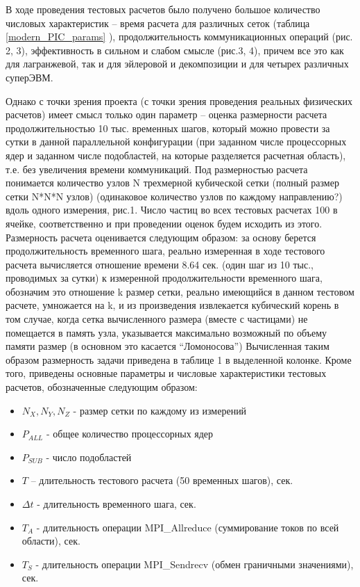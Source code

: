 В ходе проведения тестовых расчетов было получено большое количество числовых характеристик – время расчета для различных сеток (таблица \ref{modern_PIC_params} ), продолжительность коммуникационных операций (рис. 2, 3), эффективность в сильном и слабом смысле (рис.3, 4), причем все это как для лагранжевой, так и для эйлеровой и декомпозиции и для четырех различных суперЭВМ. 






Однако с точки зрения проекта (с точки зрения проведения реальных физических расчетов) имеет смысл только один параметр – оценка размерности расчета продолжительностью 10 тыс. временных шагов,  который можно провести за сутки в данной параллельной конфигурации (при заданном числе процессорных ядер и заданном числе подобластей, на которые разделяется расчетная область), т.е. без увеличения времени коммуникаций. Под размерностью расчета понимается количество узлов N трехмерной кубической сетки (полный размер сетки N*N*N узлов) (одинаковое количество узлов по каждому направлению?) вдоль одного измерения, рис.1. Число частиц во всех тестовых расчетах 100 в ячейке, соответственно и при проведении оценок будем исходить из этого. Размерность расчета оценивается следующим образом:
за основу берется продолжительность временного шага, реально измеренная в ходе тестового расчета
вычисляется отношение времени 8.64 сек. (один шаг из 10 тыс., проводимых за сутки) к измеренной продолжительности временного шага, обозначим это отношение k
размер сетки, реально имеющийся в данном тестовом расчете, умножается на k, и из произведения извлекается кубический корень
в том случае, когда сетка вычисленного размера (вместе с частицами) не помещается в память узла, указывается максимально возможный по объему памяти размер (в основном это касается “Ломоносова”)
Вычисленная таким образом размерность задачи приведена в таблице 1 в выделенной колонке. Кроме того, приведены основные параметры и числовые характеристики тестовых расчетов, обозначенные следующим образом:
\begin{itemize}
\item $N_X, N_Y, N_Z$  - размер сетки по каждому из измерений
\item $P_{ALL}$  - общее количество процессорных ядер
\item $P_{SUB}$  - число подобластей
\item $T$ – длительность тестового расчета (50 временных шагов), сек.
\item $\Delta t$  - длительность временного шага, сек.
\item $T_{A}$ - длительность операции MPI\_Allreduce (суммирование токов по всей области), сек.
\item $T_{S}$ - длительность операции MPI\_Sendrecv (обмен граничными значениями), сек.
\end{itemize}
	


